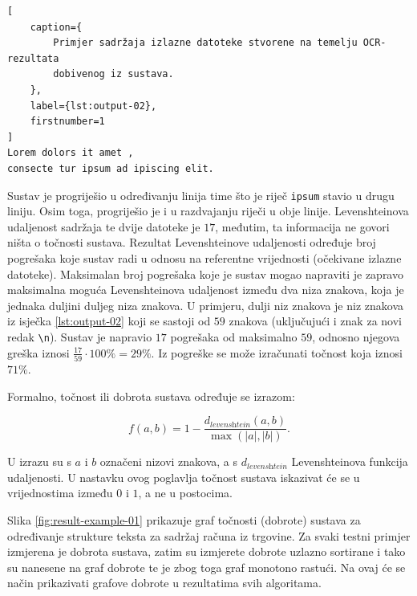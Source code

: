 \documentclass[times, utf8, zavrsni]{fer}
\begin{document}
\begin{lstlisting}[
    caption={
        Primjer sadržaja izlazne datoteke stvorene na temelju OCR-rezultata
        dobivenog iz sustava.
    },
    label={lst:output-02},
    firstnumber=1
]
Lorem dolors it amet ,
consecte tur ipsum ad ipiscing elit.
\end{lstlisting}

Sustav je progriješio u određivanju linija time što je riječ \lstinline{ipsum}
stavio u drugu liniju. Osim toga, progriješio je i u razdvajanju riječi u obje
linije. Levenshteinova udaljenost sadržaja te dvije datoteke je $17$, međutim,
ta informacija ne govori ništa o točnosti sustava. Rezultat Levenshteinove
udaljenosti određuje broj pogrešaka koje sustav radi u odnosu na referentne
vrijednosti (očekivane izlazne datoteke). Maksimalan broj pogrešaka koje je
sustav mogao napraviti je zapravo maksimalna moguća Levenshteinova udaljenost
između dva niza znakova, koja je jednaka duljini duljeg niza znakova. U
primjeru, dulji niz znakova je niz znakova iz isječka
\ref{lst:output-02} koji se sastoji od $59$ znakova (uključujući i znak za novi
redak \lstinline{\n}). Sustav je napravio $17$ pogrešaka od maksimalno $59$,
odnosno njegova greška iznosi $\frac{17}{59} \cdot 100\% = 29\%$. Iz pogreške
se može izračunati točnost koja iznosi $71\%$.

Formalno, točnost ili dobrota  sustava određuje se izrazom:

\begin{equation}
\label{eq:fitness}
f(a, b) = 1 - \frac{d_\textit{levenshtein}(a, b)}{\max(|a|, |b|)} \texttt{.}
\end{equation}

U izrazu su s $a$ i $b$ označeni nizovi znakova, a s
$d_\textit{levenshtein}$ Levenshteinova funkcija udaljenosti. U nastavku ovog
poglavlja točnost sustava iskazivat će se u vrijednostima
između $0$ i $1$, a ne u postocima.

Slika \ref{fig:result-example-01} prikazuje graf točnosti (dobrote) sustava za
određivanje strukture teksta za sadržaj računa iz trgovine. Za svaki testni
primjer izmjerena je dobrota sustava, zatim su izmjerete dobrote uzlazno
sortirane i tako su nanesene na graf dobrote te je zbog toga graf monotono
rastući. Na ovaj će se način prikazivati grafove dobrote u rezultatima svih
algoritama.
\end{document}
